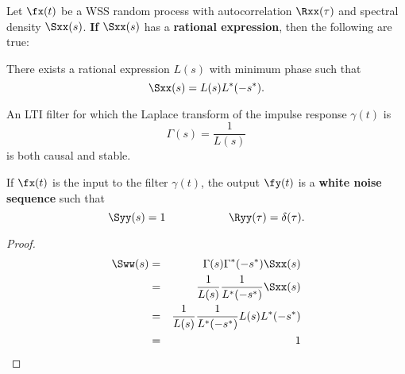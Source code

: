 \begin{theorem}
\label{thm:innovations}
Let $\fx(t)$ be a WSS random process with autocorrelation $\Rxx(\tau)$
and spectral density $\Sxx(s)$.
\textbf{If} $\Sxx(s)$ has a \textbf{rational expression},
then the following are true:
\begin{enume}
   \item There exists a rational expression $L(s)$ with minimum phase
         such that
         \[ \Sxx(s) = L(s)L^\ast(-s^\ast). \]
   \item An LTI filter for which the Laplace transform of
         the impulse response $\gamma(t)$ is
         \[ \Gamma(s) = \frac{1}{L(s)} \]
         is both causal and stable.
   \item If $\fx(t)$ is the input to the filter $\gamma(t)$,
         the output $\fy(t)$ is a \textbf{white noise sequence} such that
         \[ \Syy(s)=1 \hspace{2cm} \Ryy(\tau)=\delta(\tau).\]
\end{enume}
\end{theorem}

\begin{proof}
\begin{eqnarray*}
   \Sww(s)
     &=& \Gamma(s)\Gamma^\ast(-s^\ast) \Sxx(s)
   \\&=& \frac{1}{L(s)} \frac{1}{L^\ast(-s^\ast)} \Sxx(s)
   \\&=& \frac{1}{L(s)} \frac{1}{L^\ast(-s^\ast)} L(s) L^\ast(-s^\ast)
   \\&=& 1
\end{eqnarray*}
\end{proof}



